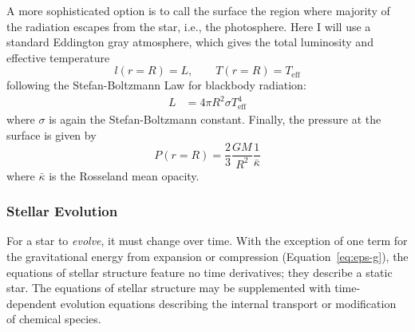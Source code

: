 A more sophisticated option is to call the surface the region where majority of the radiation escapes from the star, i.e., the photosphere. 
Here I will use a standard Eddington gray atmosphere, which gives the total luminosity and effective temperature 
\begin{equation}
    l(r=R) = L,\qquad T(r=R) = T_{\text{eff}}
\end{equation}
following the Stefan-Boltzmann Law %
for blackbody radiation: 
\begin{align} \label{eq:stefan-boltzmann} 
    L &= 4\pi R^2 \sigma T_{\text{eff}}^4
\end{align}
where $\sigma$ is again the Stefan-Boltzmann constant. %
Finally, the pressure at the surface is given by 
\begin{equation}
    P(r=R)
    =
    \frac{2}{3} 
    \frac{GM}{R^2}
    \frac{1}{\bar \kappa}
\end{equation}
where $\bar \kappa$ is the Rosseland mean opacity. 




\subsubsection*{Stellar Evolution}
For a star to \emph{evolve}, it must change over time. With the exception of one term for the gravitational energy from expansion or compression (Equation~\ref{eq:eps-g}), the equations of stellar structure feature no time derivatives; %
they describe a static star. 
The equations of stellar structure may be supplemented with time-dependent evolution equations describing the internal transport or modification of chemical species. 

